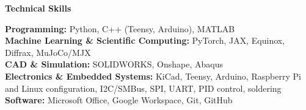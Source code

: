 \begin{center}
    \textbf{Technical Skills}
\end{center}

\textbf{Programming:} Python, C++ (Teensy, Arduino), MATLAB\\
\textbf{Machine Learning \& Scientific Computing:} PyTorch, JAX, Equinox, Diffrax, MuJoCo/MJX\\
\textbf{CAD \& Simulation:} SOLIDWORKS, Onshape, Abaqus\\
\textbf{Electronics \& Embedded Systems:} KiCad, Teensy, Arduino, Raspberry Pi and Linux configuration, I2C/SMBus, SPI, UART, PID control, soldering\\
\textbf{Software:} Microsoft Office, Google Workspace, Git, GitHub
